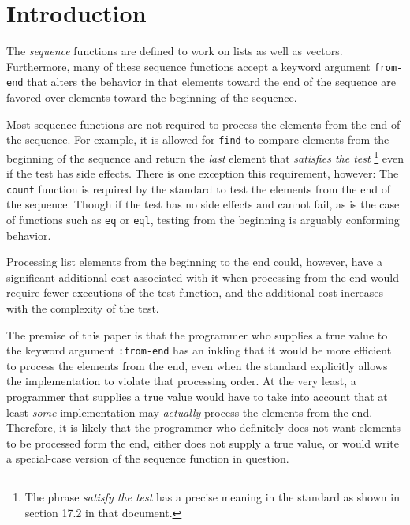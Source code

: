 \section{Introduction}

The \commonlisp{} \emph{sequence} functions are defined to work on
lists as well as vectors.  Furthermore, many of these sequence
functions accept a keyword argument \texttt{from-end} that alters the
behavior in that elements toward the end of the sequence are favored
over elements toward the beginning of the sequence.

Most sequence functions are not required to process the elements from
the end of the sequence.  For example, it is allowed for \texttt{find}
to compare elements from the beginning of the sequence and return the
\emph{last} element that \emph{satisfies the test}%
\footnote{The phrase \emph{satisfy the test} has a precise meaning in
  the \commonlisp{} standard as shown in section 17.2 in that
  document.}
even if the test has side effects.  There is one exception this
requirement, however:  The \texttt{count} function is required by the
standard to test the elements from the end of the sequence.  Though if
the test has no side effects and cannot fail, as is the case of
functions such as \texttt{eq} or \texttt{eql}, testing from the
beginning is arguably conforming behavior.

Processing list elements from the beginning to the end could, however,
have a significant additional cost associated with it when processing
from the end would require fewer executions of the test function, and
the additional cost increases with the complexity of the test.

The premise of this paper is that the programmer who supplies a true
value to the keyword argument \texttt{:from-end} has an inkling that
it would be more efficient to process the elements from the end, even
when the standard explicitly allows the implementation to violate that
processing order.  At the very least, a programmer that supplies a
true value would have to take into account that at least \emph{some}
implementation may \emph{actually} process the elements from the end.
Therefore, it is likely that the programmer who definitely does not
want elements to be processed form the end, either does not supply a
true value, or would write a special-case version of the sequence
function in question.

